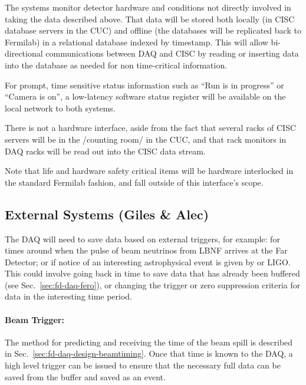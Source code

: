 The  systems monitor detector hardware and conditions not
directly involved in taking the data described above.
That data will be stored both locally (in CISC database servers in the
CUC) and offline (the databases will be replicated back to Fermilab)
in a relational database indexed by timestamp.
This will allow bi-directional communications between DAQ and CISC by
reading or inserting data into the database as needed for non
time-critical information.  

For prompt, time sensitive status information such as ``Run is in
progress'' or ``Camera is on'', a low-latency software status register
will be available on the local network to both systems.

There is not a hardware interface, aside from the fact that several
racks of CISC servers will be in the /counting room/ in the CUC, and that rack
monitors in DAQ racks will be read out into the CISC data stream.

Note that life and hardware safety critical items will be hardware
interlocked in the standard Fermilab fashion, and fall outside of this
interface's scope.


\subsection{External Systems (Giles \& Alec)}
\label{sec:fd-daq-intfc-ext}


The DAQ will need to save data based on external triggers, for
example: for times around when the pulse of beam neutrinos from LBNF
arrives at the Far Detector; or if notice of an interesting
astrophysical event is given by \cite{snews} or LIGO.
This could involve going back in time to save data that has already
been buffered (see Sec.~\ref{sec:fd-daq-fero}), or changing the trigger
or zero suppression criteria for data in the interesting time period.


\paragraph{Beam Trigger:} The method for predicting and receiving the
time of the beam spill is described in
Sec.~\ref{sec:fd-daq-design-beamtiming}.
Once that time is known to the DAQ, a high level trigger can be issued
to ensure that the necessary full data can be saved from the buffer
and saved as an event.

